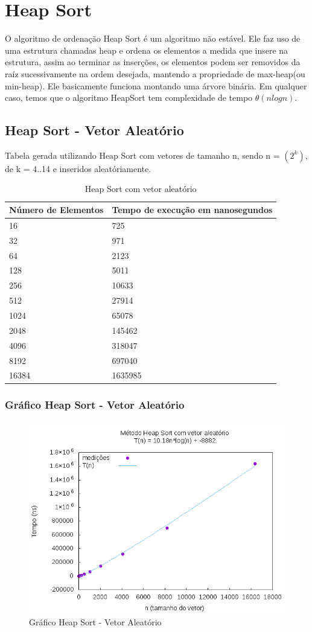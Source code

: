\documentclass[12pt,a4paper,twoside]{report}
\begin{document}
\chapter{Heap Sort}
O algoritmo de ordenação Heap Sort é um algoritmo não estável. Ele faz uso de uma estrutura chamadas heap e ordena os elementos a medida que insere na estrutura, assim ao terminar as inserções, os elementos podem ser removidos da raíz sucessivamente na ordem desejada, mantendo a propriedade de max-heap(ou min-heap).
Ele basicamente funciona montando uma árvore binária.
Em qualquer caso, temos que o algoritmo HeapSort tem complexidade de tempo $\theta(nlogn)$.

\section{Heap Sort - Vetor Aleatório}
Tabela gerada utilizando Heap Sort com vetores de tamanho n, sendo n = $(2^k)$, de k = 4..14 e inseridos aleatóriamente.
\begin{table}[H]
\centering
\caption{Heap Sort com vetor aleatório}
\label{my-label}
\begin{tabular}{|l|l|}
\hline
\multicolumn{1}{|c|}{\textbf{Número de Elementos}} & \multicolumn{1}{c|}{\textbf{Tempo de execução em nanosegundos}} \\ \hline
16 & 725 \\ \hline
32 & 971 \\ \hline
64 & 2123 \\ \hline
128 & 5011 \\ \hline
256 & 10633 \\ \hline
512 & 27914 \\ \hline
1024 & 65078 \\ \hline
2048 & 145462 \\ \hline
4096 & 318047 \\ \hline
8192 & 697040 \\ \hline
16384 & 1635985 \\ \hline
\end{tabular}
\end{table}

\subsection{Gráfico Heap Sort - Vetor Aleatório}
\begin{figure}[H]
    \centering
    \includegraphics[width=0.7\linewidth]{graficos/HeapSort/vIntAleatorio/vIntAleatorio.png}
  \caption{Gráfico Heap Sort - Vetor Aleatório}
\end{figure}
\end{document}
